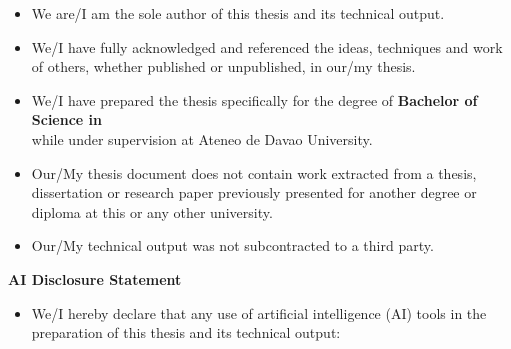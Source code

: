 \documentclass[11pt,letterpaper]{article}
\newif\iffilled
\begin{document}
\begin{itemize}[leftmargin=1.6em, itemsep=2.5pt, topsep=0pt]
  \iffilled
    \item We are the sole authors of this thesis and its technical output.
    \item We have fully acknowledged and referenced the ideas, techniques and work of others, whether published or unpublished, in our thesis.
    \item We have prepared the thesis specifically for the degree of \textbf{Bachelor of Science in Computer Science} while under supervision at Ateneo de Davao University.
    \item Our thesis document does not contain work extracted from a thesis, dissertation or research paper previously presented for another degree or diploma at this or any other university.
    \item Our technical output was not subcontracted to a third party.
  \else
    \item We are/I am the sole author of this thesis and its technical output.
    \item We/I have fully acknowledged and referenced the ideas, techniques and work of others, whether published or unpublished, in our/my thesis.
    \item We/I have prepared the thesis specifically for the degree of \textbf{Bachelor of Science in}\\[2pt]
    \underline{\hspace{5.5cm}} while under supervision at Ateneo de Davao University.
    \item Our/My thesis document does not contain work extracted from a thesis, dissertation or research paper previously presented for another degree or diploma at this or any other university.
    \item Our/My technical output was not subcontracted to a third party.
  \fi
\end{itemize}

\vspace{0.2cm}

{\fontsize{12pt}{15pt}\selectfont \textbf{AI Disclosure Statement}\par}

\vspace{0.05cm}
\begin{itemize}[leftmargin=1.6em, itemsep=1pt, topsep=0pt]
  \iffilled
    \item We hereby declare that any use of artificial intelligence (AI) tools in the preparation of this thesis and its technical output:
  \else
    \item We/I hereby declare that any use of artificial intelligence (AI) tools in the preparation of this thesis and its technical output:
  \fi
\end{itemize}
\end{document}
